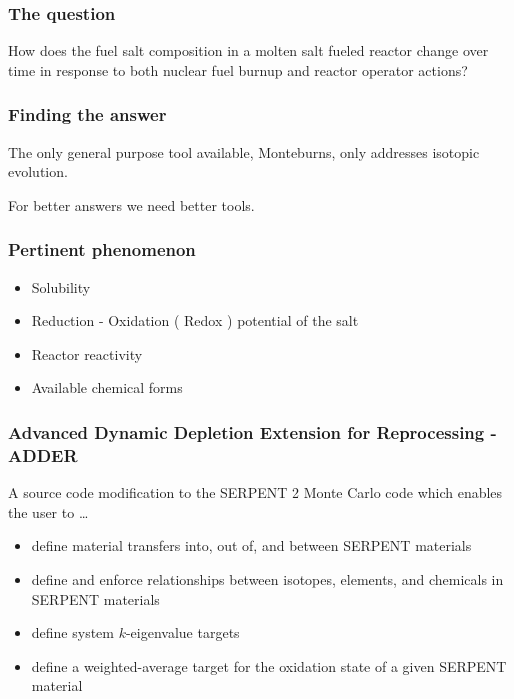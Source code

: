 \documentclass{beamer}
\begin{document}
\begin{frame}
\frametitle{The question}

How does the fuel salt composition in a molten salt fueled reactor change over
time in response to both nuclear fuel burnup and reactor operator actions?

\end{frame}

\begin{frame}
\frametitle{Finding the answer}

The only general purpose tool available, Monteburns, only addresses isotopic
evolution.

\hspace{2cm}

For better answers we need better tools.

\end{frame}

\begin{frame}
\frametitle{Pertinent phenomenon}

    \begin{itemize}
        \item Solubility
        \item Reduction - Oxidation ( Redox ) potential of the salt
        \item Reactor reactivity
        \item Available chemical forms
    \end{itemize}

\end{frame}

\begin{frame}
\frametitle{Advanced Dynamic Depletion Extension for Reprocessing - ADDER}

A source code modification to the SERPENT 2 Monte Carlo code which enables the
user to \ldots

    \begin{itemize}
        \item define material transfers into, out of, and between SERPENT materials
        \item define and enforce relationships between isotopes, elements, and chemicals in SERPENT materials
        \item define system $k$-eigenvalue targets
        \item define a weighted-average target for the oxidation state of a given SERPENT material
    \end{itemize}

\end{frame}
\end{document}
